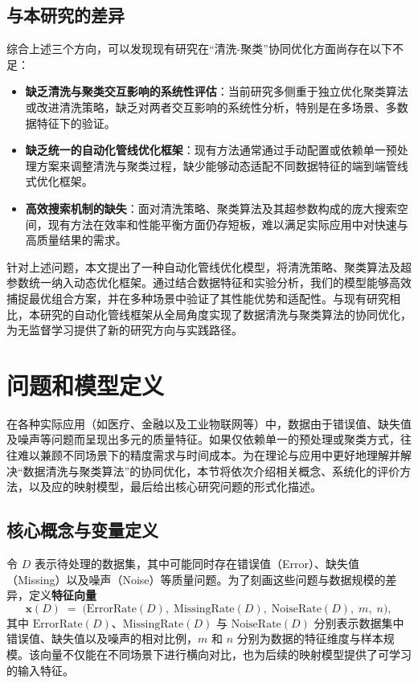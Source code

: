 \documentclass[10pt]{article} %
\numberwithin{equation}{section}
\begin{document}
\subsection{与本研究的差异}
综合上述三个方向，可以发现现有研究在“清洗-聚类”协同优化方面尚存在以下不足：
\begin{itemize}
    \item \textbf{缺乏清洗与聚类交互影响的系统性评估}：当前研究多侧重于独立优化聚类算法或改进清洗策略，缺乏对两者交互影响的系统性分析，特别是在多场景、多数据特征下的验证。
    \item \textbf{缺乏统一的自动化管线优化框架}：现有方法通常通过手动配置或依赖单一预处理方案来调整清洗与聚类过程，缺少能够动态适配不同数据特征的端到端管线式优化框架。
    \item \textbf{高效搜索机制的缺失}：面对清洗策略、聚类算法及其超参数构成的庞大搜索空间，现有方法在效率和性能平衡方面仍存短板，难以满足实际应用中对快速与高质量结果的需求。
\end{itemize}

针对上述问题，本文提出了一种自动化管线优化模型，将清洗策略、聚类算法及超参数统一纳入动态优化框架。通过结合数据特征和实验分析，我们的模型能够高效捕捉最优组合方案，并在多种场景中验证了其性能优势和适配性。与现有研究相比，本研究的自动化管线框架从全局角度实现了数据清洗与聚类算法的协同优化，为无监督学习提供了新的研究方向与实践路径。

\section{问题和模型定义}
\label{sec:problem-and-model}

在各种实际应用（如医疗、金融以及工业物联网等）中，数据由于错误值、缺失值及噪声等问题而呈现出多元的质量特征。如果仅依赖单一的预处理或聚类方式，往往难以兼顾不同场景下的精度需求与时间成本。为在理论与应用中更好地理解并解决“数据清洗与聚类算法”的协同优化，本节将依次介绍相关概念、系统化的评价方法，以及应的映射模型，最后给出核心研究问题的形式化描述。

\subsection{核心概念与变量定义}
\label{subsec:core-concepts}

令 \(D\) 表示待处理的数据集，其中可能同时存在错误值（Error）、缺失值（Missing）以及噪声（Noise）等质量问题。为了刻画这些问题与数据规模的差异，定义\textbf{特征向量}
\begin{equation}\label{eq:xD}
  \mathbf{x}(D) 
  \;=\; 
  \bigl(\mathrm{ErrorRate}(D),\; \mathrm{MissingRate}(D),\; \mathrm{NoiseRate}(D),\; m,\; n\bigr),
\end{equation}
其中 \(\mathrm{ErrorRate}(D)\)、\(\mathrm{MissingRate}(D)\) 与 \(\mathrm{NoiseRate}(D)\) 分别表示数据集中错误值、缺失值以及噪声的相对比例，\(m\) 和 \(n\) 分别为数据的特征维度与样本规模。该向量不仅能在不同场景下进行横向对比，也为后续的映射模型提供了可学习的输入特征。
\end{document}
